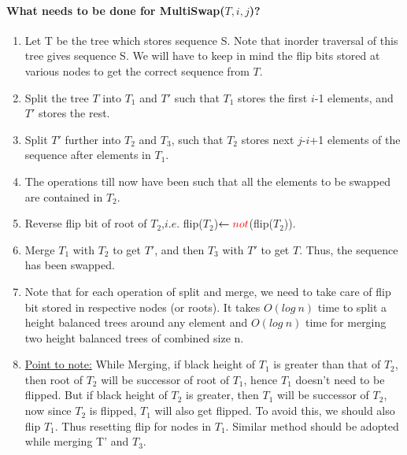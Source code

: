 \documentclass[pdftex,a4paper,12pt]{report}
\begin{document}
\paragraph{What needs to be done for MultiSwap($T, i, j$)?}
\begin{enumerate}
	\item Let T be the tree which stores sequence S. Note that inorder traversal of this tree gives sequence S.
	We will have to keep in mind the flip bits stored at various nodes to get the correct sequence from $T$.
	\item Split the tree $T$ into $T_1$ and $T'$ such that $T_1$ stores the first $i$-1 elements, and $T'$
	stores the rest.
	\item Split $T'$ further into $T_2$ and $T_3$, such that $T_2$ stores next $j$-$i$+1 elements of the sequence 
	after elements in $T_1$.
	\item The operations till now have been such that all the elements to be swapped are contained in $T_2$.
	\item Reverse flip bit of root of $T_2$,$i.e.$ flip($T_2$)$\gets \textcolor{red}{not}$(flip($T_2$)).
	\item Merge $T_1$ with $T_2$ to get $T'$, and then $T_3$ with $T'$ to get $T$. Thus, the sequence has
	been swapped.
	\item Note that for each operation of split and merge, we need to take care of flip bit stored in respective 
	nodes (or roots). It takes $O(log\ n)$ time to split a height balanced trees around any element and $O(log\ n)$ 
	time for merging two height balanced trees of combined size n.
	\item \underline{Point to note:} While Merging, if black height of $T_1$ is greater than that of $T_2$, then root of $T_2$ 
	will be successor of root of $T_1$, hence $T_1$ doesn't need to be flipped. But if black height of $T_2$ is greater, 
	then $T_1$ will be successor of $T_2$, now since $T_2$ is flipped, $T_1$ will also get flipped. To avoid this, we should 
	also flip $T_1$. Thus resetting flip for nodes in $T_1$. Similar method should be adopted while merging T' and $T_3$.
\end{enumerate}
\end{document}
